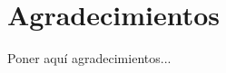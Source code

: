 \chapter*{Agradecimientos}
\thispagestyle{empty}

       \vspace{1cm}


Poner aquí agradecimientos...

